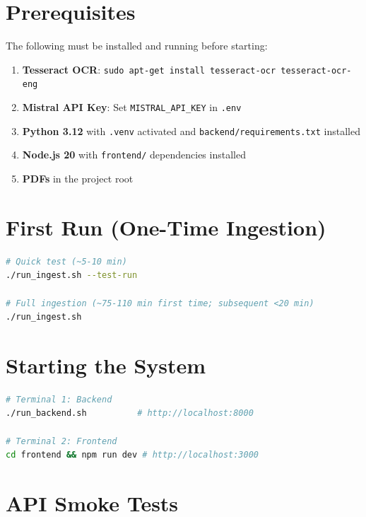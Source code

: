 \documentclass[12pt,a4paper]{report}
\begin{document}
\section{Prerequisites}

The following must be installed and running before starting:

\begin{enumerate}
  \item \textbf{Tesseract OCR}: \texttt{sudo apt-get install tesseract-ocr tesseract-ocr-eng}
  \item \textbf{Mistral API Key}: Set \texttt{MISTRAL\_API\_KEY} in \texttt{.env}
  \item \textbf{Python 3.12} with \texttt{.venv} activated and \texttt{backend/requirements.txt} installed
  \item \textbf{Node.js 20} with \texttt{frontend/} dependencies installed
  \item \textbf{PDFs} in the project root
\end{enumerate}

\section{First Run (One-Time Ingestion)}

\begin{lstlisting}[language=bash]
# Quick test (~5-10 min)
./run_ingest.sh --test-run

# Full ingestion (~75-110 min first time; subsequent <20 min)
./run_ingest.sh
\end{lstlisting}

\section{Starting the System}

\begin{lstlisting}[language=bash]
# Terminal 1: Backend
./run_backend.sh          # http://localhost:8000

# Terminal 2: Frontend
cd frontend && npm run dev # http://localhost:3000
\end{lstlisting}

\section{API Smoke Tests}
\end{document}
